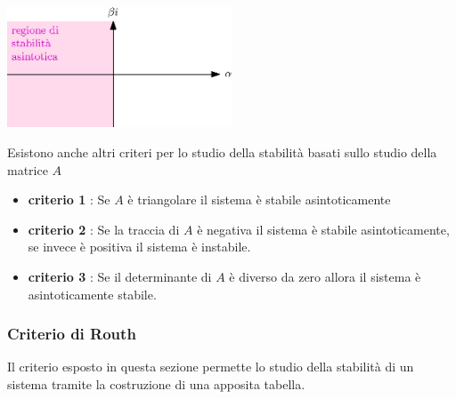 \documentclass[10pt, letterpaper]{report}
\begin{document}
\begin{center}
    \includegraphics[width=0.5\textwidth ]{images/regioneStab.eps}
\end{center}
Esistono anche altri criteri per lo studio della stabilità basati sullo studio della 
matrice $A$\begin{itemize}
    \item \textbf{criterio 1} : Se $A$ è triangolare il sistema è stabile asintoticamente 
    \item \textbf{criterio 2} : Se la traccia di $A$ è negativa il sistema è stabile asintoticamente, se 
    invece è positiva il sistema è instabile. 
    \item \textbf{criterio 3} : Se il determinante di $A$ è 
    diverso da zero allora il sistema è asintoticamente stabile.
\end{itemize}
\subsubsection{Criterio di Routh}
Il criterio esposto in questa sezione permette lo 
studio della stabilità di un sistema tramite la costruzione 
di una apposita tabella.\flowerLine
\newpage 
\end{document}
